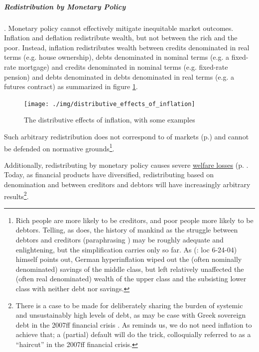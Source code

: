 \subparagraph{Redistribution by Monetary Policy}  \label{sec:distributive_effects_of_inflation}.  Monetary policy cannot effectively mitigate inequitable market outcomes. Inflation and deflation redistribute wealth, but not between the rich and the poor. Instead, inflation redistributes wealth between credits denominated in real terms (e.g. house ownership), debts denominated in nominal terms (e.g. a fixed-rate mortgage) and credits denominated in nominal terms (e.g. fixed-rate pension) and debts denominated in debts denominated in real terms (e.g. a futures contract) as summarized in figure \ref{fig:distributive_effects_of_inflation}. 

\begin{figure}[htbp]
	\centering
	\texttt{[image: ./img/distributive\_effects\_of\_inflation]}  
	\caption[Distributive Effects of Inflation]{The distributive effects of inflation, with some examples}
	\label{fig:distributive_effects_of_inflation}
\end{figure}

Such arbitrary redistribution does not correspond to  of markets  (p.\pageref{sec:inequality_dynamics}) and cannot be defended on normative grounds\footnote{
	Rich people are more likely to be creditors, and poor people more likely to be debtors. Telling, as \cite{Coggan2011} does, the history of mankind as the struggle between debtors and creditors (paraphrasing \citealt{Marx-1867-aa}) may be roughly adequate and enlightening, but the simplification carries only so far. As \citeauthor{Coggan2011}(\citeyear{Coggan2011}: loc 6-24-04) himself points out, German hyperinflation wiped out the (often nominally denominated) savings of the middle class, but left relatively unaffected the (often real denominated) wealth of the upper class and the subsisting lower class with neither debt nor savings.}. 
	
Additionally, redistributing by monetary policy causes severe \hyperref[sec:price_stability]{welfare losses} (p. \pageref{sec:price_stability}. Today, as financial products have diversified, redistributing based on denomination and between creditors and debtors will have increasingly arbitrary results\footnote{
	There is a case to be made for deliberately sharing the burden of systemic and unsustainably high levels of debt, as may be case with Greek sovereign debt in the 2007ff financial crisis \citep{Coggan2011}. As \citeauthor{Coggan2011} reminds us, we do not need inflation to achieve that; a (partial) default will do the trick, colloquially referred to as a ``haircut'' in the 2007ff financial crisis.}.

